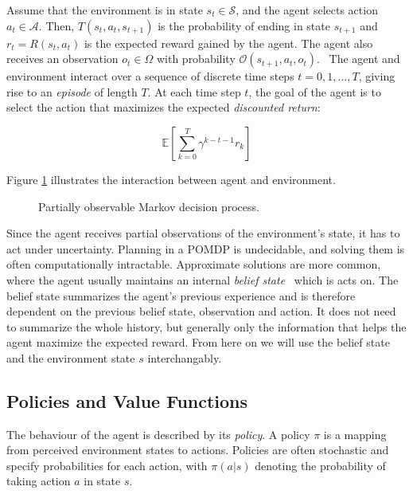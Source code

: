 Assume that the environment is in state \(s_t \in \mathcal{S}\), and the agent selects action \(a_t \in \mathcal{A}\).
Then, \(T(s_t, a_t, s_{t+1})\) is the probability of ending in state \(s_{t+1}\) and \(r_t = R(s_t, a_t)\) is the expected reward gained by the agent.
The agent also receives an observation \(o_t \in \Omega\) with probability \(\mathcal{O}(s_{t+1}, a_t, o_t)\).~\cite{kaelbling_pomdp_1998}
The agent and environment interact over a sequence of discrete time steps \(t = 0, 1, \dots, T\), giving rise to an \textit{episode} of length \(T\).
At each time step \(t\), the goal of the agent is to select the action that maximizes the expected \textit{discounted return}:

\[ 
    \mathbb{E} \left[ \sum_{k=0}^T \gamma^{k-t-1} r_k \right]
\]

Figure \ref{fig:pomdp} illustrates the interaction between agent and environment.

\begin{figure}
    \centering
    
    \label{fig:pomdp}
    \caption[Partially observable Markov decision process]{Partially observable Markov decision process.}
\end{figure}

Since the agent receives partial observations of the environment's state, it has to act under uncertainty.
Planning in a POMDP is undecidable, and solving them is often computationally intractable.
Approximate solutions are more common, where the agent usually maintains an internal \textit{belief state}~\cite{kaelbling_pomdp_1998} which is acts on.
The belief state summarizes the agent's previous experience and is therefore dependent on the previous belief state, observation and action.
It does not need to summarize the whole history, but generally only the information that helps the agent maximize the expected reward.
From here on we will use the belief state and the environment state \(s\) interchangably. 

\subsection{Policies and Value Functions}
\label{sec:policies-values}

The behaviour of the agent is described by its \textit{policy}.
A policy \(\pi\) is a mapping from perceived environment states to actions.
Policies are often stochastic and specify probabilities for each action, with \(\pi(a|s)\) denoting the probability of taking action \(a\) in state \(s\).~\cite{sutton_reinforcement_2018}


